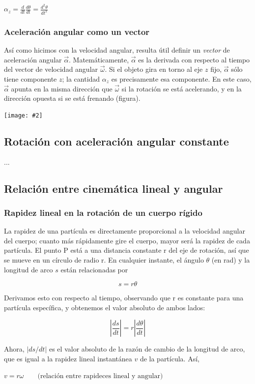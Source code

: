 \documentclass{article}
\newcommand{\newsubsection}[1]{
    \vspace{0.5cm}
    \color{sectionColor}
    \subsection{\bl{#1}}
    \color{black}
    \vspace{0.5cm}
}
\newcommand{\newtitle}[1]{
    \color{titleColor}
    \subsubsection{#1}
    \color{black}
}
\newcommand{\bl}[1]{\textbf{#1}}
\newcommand{\definicion}[1]{%
    \vspace{0.5cm}
    \begin{definicionbox}
        #1
    \end{definicionbox}
    \vspace{0.5cm}
}
\newcommand{\ladoALado}[4]{
    \begin{minipage}[t]{#3\textwidth}
        \vspace{0pt}
        #1
    \end{minipage}
    \hfill
    \begin{minipage}[t]{#4\textwidth}
        \vspace{0pt}
        \centering
        \texttt{[image: \#2]}
    \end{minipage}
}
\begin{document}
    \definicion{
        \centering
        \( \alpha_z = \frac{d}{dt} \frac{d\theta}{dt} = \frac{d^2 \theta}{dt^2} \)
    }

    \pagebreak

    \newtitle{Aceleración angular como un vector}

    \ladoALado{
        \par Así como hicimos con la velocidad angular, resulta útil deﬁnir un \textit{vector} de aceleración angular $\vec{\alpha}$. Matemáticamente, $\vec{\alpha}$ es la derivada con respecto al tiempo del vector de velocidad angular $\vec{\omega}$. Si el objeto gira en torno al eje $z$ ﬁjo, $\vec{\alpha}$ sólo tiene componente $z$; la cantidad $\alpha_z$ es precisamente esa componente. En este caso, $\vec{\alpha}$ apunta en la misma dirección que $\vec{\omega}$ si la rotación se está acelerando, y en la dirección opuesta si se está frenando (ﬁgura).
    }{img/8.1-2.png}{0.6}{0.4}

    \newsubsection{Rotación con aceleración angular constante}

    \par ... %

    \newsubsection{Relación entre cinemática lineal y angular}

    \newtitle{Rapidez lineal en la rotación de un cuerpo rígido}

    \par La rapidez de una partícula es directamente proporcional a la velocidad angular del cuerpo; cuanto más rápidamente gire el cuerpo, mayor será la rapidez de cada partícula. El punto P está a una distancia constante r del eje de rotación, así que se mueve en un círculo de radio r. En cualquier instante, el ángulo $\theta$ (en rad) y la longitud de arco $s$ están relacionadas por

    \[ s = r \theta \]

    \par Derivamos esto con respecto al tiempo, observando que r es constante para una partícula especíﬁca, y obtenemos el valor absoluto de ambos lados:

    \[ \left\lvert \frac{ds}{dt}\right\rvert  = r \left\lvert \frac{d\theta}{dt}\right\rvert  \]

    \par Ahora, $\left\lvert ds/dt\right\rvert $ es el valor absoluto de la razón de cambio de la longitud de arco, que es igual a la rapidez lineal instantánea $v$ de la partícula. Así,

    \definicion{
        \centering
        \( v = r \omega \quad \quad \text{(relación entre rapideces lineal y angular)} \)
    }
\end{document}
